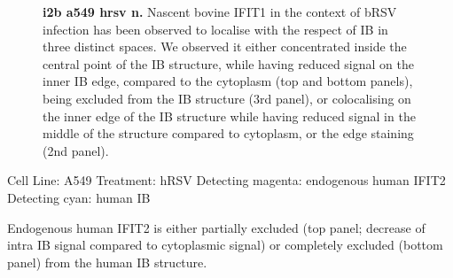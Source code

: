 \begin{figure}
\begin{subfigure}{1\textwidth}
    \end{subfigure}
    \caption[i2b a549 hrsv n]{\textbf{i2b a549 hrsv n.} Nascent bovine IFIT1 in the context of bRSV infection has been observed to localise with the respect of IB in three distinct spaces. We observed it either concentrated inside the central point of the IB structure, while having reduced signal on the inner IB edge, compared to the cytoplasm (top and bottom panels), being excluded from the IB structure (3rd panel), or colocalising on the inner edge of the IB structure while having reduced signal in the middle of the structure compared to cytoplasm, or the edge staining (2nd panel).}
    \label{fig:i2b a549 hrsv n}
\end{figure}

Cell Line: A549 \newline
Treatment: hRSV \newline
Detecting magenta: endogenous human IFIT2  \newline
Detecting cyan: human IB \newline

Endogenous human IFIT2 is either partially excluded (top panel; decrease of intra IB signal compared to cytoplasmic signal) or completely excluded (bottom panel) from the human IB structure.

